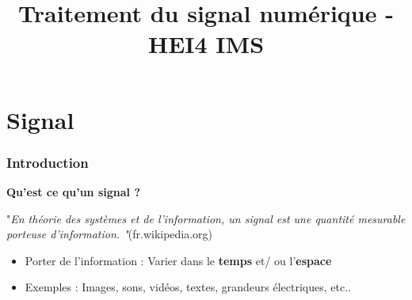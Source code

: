 \documentclass{beamer}
\title[Traitement du signal numérique]{Traitement du signal numérique - HEI4 IMS}
\author[Antony Bazir]{}
\begin{document}
\section{Signal}
\begin{frame}
\frametitle{Introduction}
\textbf{Qu'est ce qu'un signal  ?}

\vspace{1cm}
"\textit{En théorie des systèmes et de l'information, un signal est une quantité mesurable porteuse d’information. "}(fr.wikipedia.org)\\
\vspace{1cm}
\begin{itemize}
\item Porter de l'information : Varier dans le \textbf{temps} et/ ou l'\textbf{espace}
\item Exemples : Images, sons, vidéos, textes, grandeurs électriques, etc..
\end{itemize}
\end{frame}
\end{document}
